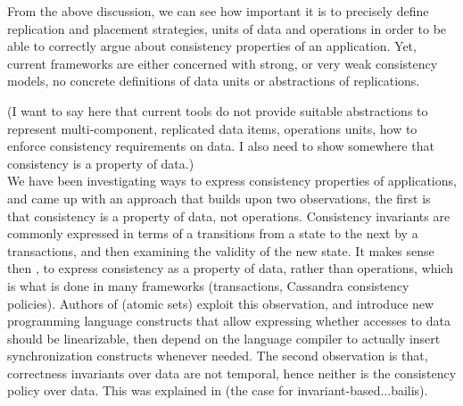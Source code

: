From the above discussion, we can see how important it is to precisely define
replication and placement strategies, units of data and operations in order to
be able to correctly argue about consistency properties of an application. Yet,
current frameworks are either concerned with strong,
or very weak consistency models, no concrete definitions of data units or
abstractions of replications. 


(I want to say here that current tools do not provide suitable abstractions to
represent multi-component, replicated data items, operations units, how to
enforce consistency requirements on data. I also need to show somewhere that
consistency is a property of data.)\\

We have been investigating ways to express consistency properties of
applications, and came up with an approach that builds upon two observations, the
first is that consistency is a property of data, not operations. Consistency
invariants are commonly expressed in terms of a transitions from a state to the
next by a transactions, and then examining the validity of the new state. It
makes sense then , to express consistency as a property of data, rather than
operations, which is what is done in many frameworks (transactions, Cassandra
consistency policies). Authors of (atomic sets) exploit this observation, and
introduce new programming language constructs that allow expressing whether
accesses to data should be linearizable, then depend on the language compiler to
actually insert synchronization constructs whenever needed. The second
observation is that, correctness invariants over data are not temporal, hence
neither is the consistency policy over data. This was explained in (the case for
invariant-based...bailis). 

